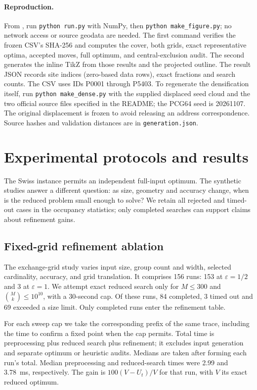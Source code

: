 \documentclass[a4paper,12pt]{article}
\numberwithin{equation}{section}
\begin{document}
\paragraph{Reproduction.}
From , run \texttt{python run.py} with
NumPy, then \texttt{python make\_figure.py}; no network access or source geodata
are needed. The first command verifies the frozen CSV's SHA-256 and computes the
cover, both grids, exact representative optima, accepted moves, full optimum, and
central-exclusion audit. The second generates the inline TikZ from those results
and the projected outline. The result JSON records site indices (zero-based data
rows), exact fractions and search counts. The CSV uses IDs P0001 through P5403.
To regenerate the densification itself, run \texttt{python make\_dense.py} with the supplied
displaced seed cloud and the two official source files specified in the README;
the PCG64 seed is 20261107. The original displacement is frozen to avoid releasing
an address correspondence. Source hashes and validation distances are in
\texttt{generation.json}.

\section{Experimental protocols and results}\label{sec:paired-protocol}
The Swiss instance permits an independent full-input optimum. The synthetic
studies answer a different question: as size, geometry and accuracy change,
when is the reduced problem small enough to solve? We retain all rejected
and timed-out cases in the occupancy statistics; only completed searches
can support claims about refinement gains.

\subsection{Fixed-grid refinement ablation}\label{sec:sweeps}
The exchange-grid study varies input size, group count and width, selected cardinality, accuracy,
and grid translation. It comprises 156 runs: 153 at $\varepsilon=1/2$ and 3 at $\varepsilon=1$. We
attempt exact reduced search only for $M\le300$ and $\binom Mk\le10^{10}$, with a 30-second cap.
Of these runs, 84 completed, 3 timed out and 69 exceeded a size limit. Only completed runs enter
the refinement table.

For each sweep cap we take the corresponding prefix of the same trace, including the time to
confirm a fixed point when the cap permits. Total time is preprocessing plus reduced search plus
refinement; it excludes input generation and separate optimum or heuristic audits. Medians are
taken after forming each run's total. Median preprocessing and reduced-search times were 2.99 and
3.78~ms, respectively. The gain is $100(V-U_t)/V$ for that run, with $V$ its exact reduced
optimum.
\end{document}
